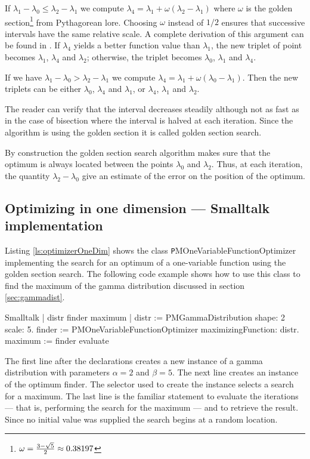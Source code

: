 If $\lambda_1-\lambda_0\leq\lambda_2-\lambda_1$ we compute
$\lambda_4 =\lambda_1 + \omega\left(\lambda_2-\lambda_1\right)$
where $\omega$ is the golden
section\footnote{$\omega={3-\sqrt{5}\over 2}\approx0.38197$} from
Pythagorean lore. Choosing $\omega$ instead of $1/2$ ensures that
successive intervals have the same relative scale. A complete
derivation of this argument can be found in \cite{Press}. If
$\lambda_4$ yields a better function value than $\lambda_1$, the
new triplet of point becomes $\lambda_1$, $\lambda_4$ and
$\lambda_2$; otherwise, the triplet becomes $\lambda_0$,
$\lambda_1$ and $\lambda_4$.

If we have $\lambda_1-\lambda_0>\lambda_2-\lambda_1$ we compute
$\lambda_4 =\lambda_1 + \omega\left(\lambda_0-\lambda_1\right)$.
Then the new triplets can be either $\lambda_0$, $\lambda_4$ and
$\lambda_1$, or $\lambda_4$, $\lambda_1$ and $\lambda_2$.

The reader can verify that the interval decreases steadily
although not as fast as in the case of bisection where the
interval is halved at each iteration.
Since the algorithm is using the golden section it is called golden section search.

By construction the golden section search algorithm makes sure
that the optimum is always located between the points $\lambda_0$
and $\lambda_2$. Thus, at each iteration, the quantity
$\lambda_2-\lambda_0$ give an estimate of the error on the
position of the optimum.

\subsection{Optimizing in one dimension --- Smalltalk implementation}
 Listing
\ref{ls:optimizerOneDim} shows the class {\texttt
PMOneVariableFunctionOptimizer} implementing the search for an
optimum of a one-variable function using the golden section
search. The following code example shows how to use this class to
find the maximum of the gamma distribution discussed in section
\ref{sec:gammadist}.

\begin{displaycode}{Smalltalk}
| distr finder maximum |
   distr := PMGammaDistribution shape: 2 scale: 5.
   finder := PMOneVariableFunctionOptimizer maximizingFunction: distr.
   maximum := finder evaluate
\end{displaycode}

The first line after the declarations creates a new instance of a
gamma distribution with parameters $\alpha = 2$ and $\beta = 5$.
The next line creates an instance of the optimum finder. The
selector used to create the instance selects a search for a
maximum. The last line is the familiar statement to evaluate the
iterations --- that is, performing the search for the maximum ---
and to retrieve the result. Since no initial value was supplied
the search begins at a random location.


